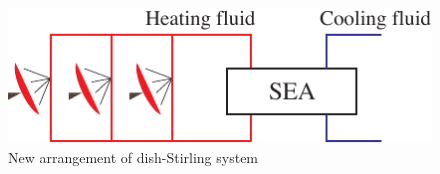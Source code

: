 \documentclass[review,3p,10t]{elsarticle}
\begin{document}

\noindent \begin{figure}[htbp]
\begin{center}
	\includegraphics[width = 0.7\columnwidth]{./graphics/Dish_SEA.pdf}
	\caption{New arrangement of dish-Stirling system}
	\label{fig:Dish_SEA}
\end{center}
\end{figure}
\end{document}

